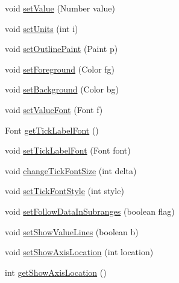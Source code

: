 \begin{DoxyCompactItemize}
\item 
void \mbox{\hyperlink{classorg_1_1jfree_1_1chart_1_1plot_1_1_j_thermometer_a8b2ab61d02f9867e7f7c4f26dfb78407}{set\+Value}} (Number value)
\item 
void \mbox{\hyperlink{classorg_1_1jfree_1_1chart_1_1plot_1_1_j_thermometer_a42b44e7d560b782c99cd8a7dc4a743fe}{set\+Units}} (int i)
\item 
void \mbox{\hyperlink{classorg_1_1jfree_1_1chart_1_1plot_1_1_j_thermometer_a39097b2c48ea1cd1d2350922a55aec33}{set\+Outline\+Paint}} (Paint p)
\item 
void \mbox{\hyperlink{classorg_1_1jfree_1_1chart_1_1plot_1_1_j_thermometer_abfd996ba772b38f8fb023aec26384d90}{set\+Foreground}} (Color fg)
\item 
void \mbox{\hyperlink{classorg_1_1jfree_1_1chart_1_1plot_1_1_j_thermometer_a162e81de2b5a3d5c7992164b5af3ebed}{set\+Background}} (Color bg)
\item 
void \mbox{\hyperlink{classorg_1_1jfree_1_1chart_1_1plot_1_1_j_thermometer_aa58f4f70b236d4b8b9e3bb3e782e230b}{set\+Value\+Font}} (Font f)
\item 
Font \mbox{\hyperlink{classorg_1_1jfree_1_1chart_1_1plot_1_1_j_thermometer_abbe644feeb9a88044214e3b7b4301755}{get\+Tick\+Label\+Font}} ()
\item 
void \mbox{\hyperlink{classorg_1_1jfree_1_1chart_1_1plot_1_1_j_thermometer_a64a61c9e58e804ce028bfd295008c2c3}{set\+Tick\+Label\+Font}} (Font font)
\item 
void \mbox{\hyperlink{classorg_1_1jfree_1_1chart_1_1plot_1_1_j_thermometer_ac50051aeccb7a2e267e80cb7a60094e9}{change\+Tick\+Font\+Size}} (int delta)
\item 
void \mbox{\hyperlink{classorg_1_1jfree_1_1chart_1_1plot_1_1_j_thermometer_a61fc292c71b27ea3a2352483d7320012}{set\+Tick\+Font\+Style}} (int style)
\item 
void \mbox{\hyperlink{classorg_1_1jfree_1_1chart_1_1plot_1_1_j_thermometer_a9562c962630493758f92d38e423aec2c}{set\+Follow\+Data\+In\+Subranges}} (boolean flag)
\item 
void \mbox{\hyperlink{classorg_1_1jfree_1_1chart_1_1plot_1_1_j_thermometer_aad46a15656e9429b2d9092f3c331ff8a}{set\+Show\+Value\+Lines}} (boolean b)
\item 
void \mbox{\hyperlink{classorg_1_1jfree_1_1chart_1_1plot_1_1_j_thermometer_afd2a26a24c9e5b70a12ee99da7281a09}{set\+Show\+Axis\+Location}} (int location)
\item 
int \mbox{\hyperlink{classorg_1_1jfree_1_1chart_1_1plot_1_1_j_thermometer_adfb68432a5ab00845dab7f549da01fb1}{get\+Show\+Axis\+Location}} ()
\end{DoxyCompactItemize}


